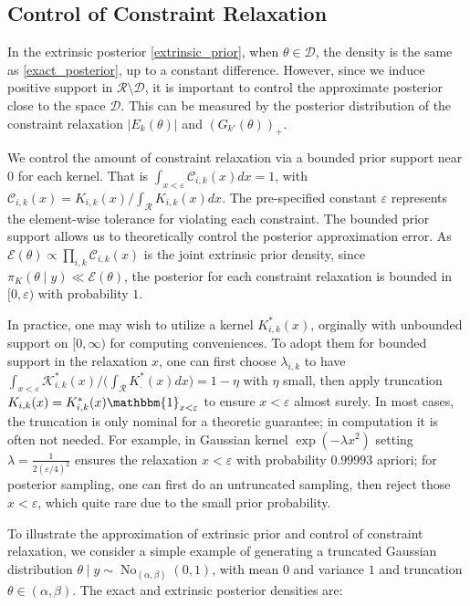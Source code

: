 \documentclass[10pt]{article}
\newcommand{\mc}[1]{\mathcal{#1}}
\DeclareMathOperator{\No}{No}
\DeclareMathOperator{\1}{\mathbbm{1}}
\begin{document}
\subsection{Control of Constraint Relaxation}

In the extrinsic posterior \eqref{extrinsic_prior}, when $\theta \in \mc D$, the density is the same as \eqref{exact_posterior}, up to a constant difference. However, since we induce positive support in $\mc R \setminus \mc D$, it is important to control the approximate posterior close to the space $\mc D$. This can be measured by the posterior distribution of the constraint relaxation $|E_k(\theta)|$ and $(G_{k'}(\theta))_+$.

We control the amount of constraint relaxation via a bounded prior support near $0$ for each kernel.  That is $\int_{x<\varepsilon} \mc C_{i,k}(x)  dx= 1$, with  $\mc C_{i,k}(x) = K_{i,k}(x) / \int_{\mc R}K_{i,k}(x) dx$. The pre-specified constant $\varepsilon$ represents the element-wise tolerance for violating each constraint. The bounded prior support allows us to theoretically control the posterior approximation error. As $\mc E(\theta) \propto \prod_{i,k} \mc C_{i,k}(x)$ is the joint extrinsic prior density, since $\pi_K(\theta \mid y) \ll \mc E(\theta)$, the posterior for each constraint relaxation is bounded in $[0,\varepsilon)$ with probability $1$.

In practice, one may wish to utilize a kernel $K^*_{i,k}(x)$, orginally with unbounded support on $[0,\infty)$ for computing conveniences. To adopt them for bounded support in the relaxation $x$, one can first choose $\lambda_{i,k}$ to have $\int_{x<\varepsilon} \mc K^*_{i,k}(x)/ \big( \int_{\mc R} K^*_{.}(x) dx\big ) = 1-\eta$ with $\eta$ small, then apply truncation $K_{i,k}(x)= K^*_{i,k}(x) \mathbbm{1}_{x<\varepsilon}$ to ensure $x<\varepsilon$ almost surely. In most cases, the truncation is only nominal for a theoretic guarantee; in computation it is often not needed. For example, in Gaussian kernel $\exp( -{\lambda x^2})$ setting $\lambda = \frac{1}{ 2(\varepsilon/4)^2}$ ensures the relaxation $x<\varepsilon$ with probability $0.99993$ apriori; for posterior sampling, one can first do an untruncated sampling, then reject those $x<\varepsilon$, which quite rare due to the small prior probability. 


To illustrate the approximation of extrinsic prior and control of constraint relaxation, we consider a simple example of generating a truncated Gaussian distribution $\theta \mid y \sim \No_{(\alpha,\beta)}(0,1)$, with mean $0$ and variance $1$ and truncation $\theta\in (\alpha,\beta)$. The exact and extrinsic posterior densities are:
\end{document}
